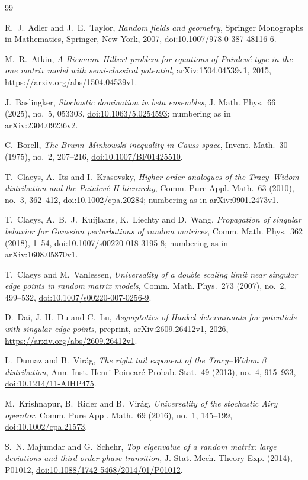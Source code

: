 \documentclass[11pt]{article}
\theoremstyle{remark}
\providecommand{\doi}[1]{\href{https://doi.org/#1}{doi:#1}}
\begin{document}
\begin{thebibliography}{99}

R.~J.~Adler and J.~E.~Taylor, \emph{Random fields and geometry}, Springer Monographs in Mathematics, Springer, New
York, 2007, \doi{10.1007/978-0-387-48116-6}.

M.~R.~Atkin, \emph{A Riemann--Hilbert problem for equations of Painlev\'e type in the one matrix model with
semi-classical potential}, arXiv:1504.04539v1, 2015,
\url{https://arxiv.org/abs/1504.04539v1}.

J.~Baslingker, \emph{Stochastic domination in beta ensembles}, J. Math. Phys.\ 66 (2025), no.~5, 053303,
\doi{10.1063/5.0254593}; numbering as in arXiv:2304.09236v2.

C.~Borell, \emph{The Brunn--Minkowski inequality in Gauss space}, Invent. Math.\ 30 (1975), no.~2, 207--216,
\doi{10.1007/BF01425510}.

T.~Claeys, A.~Its and I.~Krasovsky, \emph{Higher-order analogues of the Tracy--Widom distribution and the Painlev\'e
II hierarchy}, Comm. Pure Appl. Math.\ 63 (2010), no.~3, 362--412, \doi{10.1002/cpa.20284}; numbering as in arXiv:0901.2473v1.

T.~Claeys, A.~B.~J.~Kuijlaars, K.~Liechty and D.~Wang, \emph{Propagation of singular behavior for Gaussian
perturbations of random matrices}, Comm. Math. Phys.\ 362 (2018), 1--54, \doi{10.1007/s00220-018-3195-8}; numbering as in arXiv:1608.05870v1.

T.~Claeys and M.~Vanlessen, \emph{Universality of a double scaling limit near singular edge points in random matrix
models}, Comm. Math. Phys.\ 273 (2007), no.~2, 499--532, \doi{10.1007/s00220-007-0256-9}.

D.~Dai, J.-H.~Du and C.~Lu, \emph{Asymptotics of Hankel determinants for potentials with singular edge points},
preprint, arXiv:2609.26412v1, 2026,
\url{https://arxiv.org/abs/2609.26412v1}.

L.~Dumaz and B.~Vir\'ag, \emph{The right tail exponent of the Tracy--Widom $\beta$ distribution}, Ann. Inst. Henri
Poincar\'e Probab. Stat.\ 49 (2013), no.~4, 915--933, \doi{10.1214/11-AIHP475}.

M.~Krishnapur, B.~Rider and B.~Vir\'ag, \emph{Universality of the stochastic Airy operator}, Comm. Pure Appl. Math.\
69 (2016), no.~1, 145--199, \doi{10.1002/cpa.21573}.

S.~N. Majumdar and G.~Schehr, \emph{Top eigenvalue of a random matrix: large deviations and third order phase
transition}, J. Stat. Mech. Theory Exp. (2014), P01012, \doi{10.1088/1742-5468/2014/01/P01012}.


\end{thebibliography}
\end{document}
